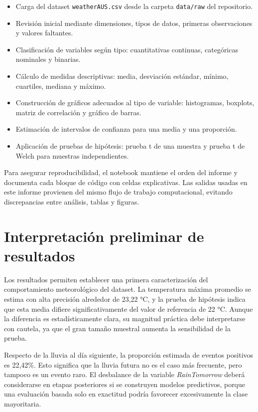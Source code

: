\documentclass[11pt,a4paper]{article}
\begin{document}
\begin{itemize}[leftmargin=1.2cm]
    \item Carga del dataset \texttt{weatherAUS.csv} desde la carpeta \texttt{data/raw} del repositorio.
    \item Revisión inicial mediante dimensiones, tipos de datos, primeras observaciones y valores faltantes.
    \item Clasificación de variables según tipo: cuantitativas continuas, categóricas nominales y binarias.
    \item Cálculo de medidas descriptivas: media, desviación estándar, mínimo, cuartiles, mediana y máximo.
    \item Construcción de gráficos adecuados al tipo de variable: histogramas, boxplots, matriz de correlación y gráfico de barras.
    \item Estimación de intervalos de confianza para una media y una proporción.
    \item Aplicación de pruebas de hipótesis: prueba t de una muestra y prueba t de Welch para muestras independientes.
\end{itemize}

Para asegurar reproducibilidad, el notebook mantiene el orden del informe y documenta cada bloque de código con celdas explicativas. Las salidas usadas en este informe provienen del mismo flujo de trabajo computacional, evitando discrepancias entre análisis, tablas y figuras.

\section{Interpretación preliminar de resultados}

Los resultados permiten establecer una primera caracterización del comportamiento meteorológico del dataset. La temperatura máxima promedio se estima con alta precisión alrededor de 23,22 °C, y la prueba de hipótesis indica que esta media difiere significativamente del valor de referencia de 22 °C. Aunque la diferencia es estadísticamente clara, su magnitud práctica debe interpretarse con cautela, ya que el gran tamaño muestral aumenta la sensibilidad de la prueba.

Respecto de la lluvia al día siguiente, la proporción estimada de eventos positivos es 22,42\%. Esto significa que la lluvia futura no es el caso más frecuente, pero tampoco es un evento raro. El desbalance de la variable \textit{RainTomorrow} deberá considerarse en etapas posteriores si se construyen modelos predictivos, porque una evaluación basada solo en exactitud podría favorecer excesivamente la clase mayoritaria.
\end{document}
